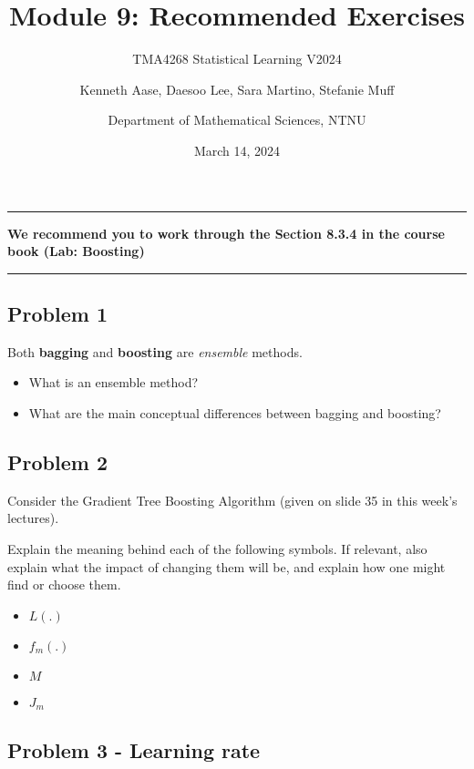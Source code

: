 \documentclass[
]{article}
\title{Module 9: Recommended Exercises}
\subtitle{TMA4268 Statistical Learning V2024}
\author{Kenneth Aase, Daesoo Lee, Sara Martino, Stefanie
Muff \and Department of Mathematical Sciences, NTNU}
\date{March 14, 2024}
\providecommand{\tightlist}{%
  \setlength{\itemsep}{0pt}\setlength{\parskip}{0pt}}
\begin{document}
\maketitle

\begin{center}\rule{0.5\linewidth}{0.5pt}\end{center}

\textbf{We recommend you to work through the Section 8.3.4 in the course
book (Lab: Boosting)}

\begin{center}\rule{0.5\linewidth}{0.5pt}\end{center}

\hypertarget{problem-1}{%
\subsection{Problem 1}\label{problem-1}}

Both \textbf{bagging} and \textbf{boosting} are \emph{ensemble} methods.

\begin{itemize}
\tightlist
\item
  What is an ensemble method?
\item
  What are the main conceptual differences between bagging and boosting?
\end{itemize}

\hypertarget{problem-2}{%
\subsection{Problem 2}\label{problem-2}}

Consider the Gradient Tree Boosting Algorithm (given on slide 35 in this
week's lectures).

Explain the meaning behind each of the following symbols. If relevant,
also explain what the impact of changing them will be, and explain how
one might find or choose them.

\begin{itemize}
\tightlist
\item
  \(L(.)\)
\item
  \(f_m(.)\)
\item
  \(M\)
\item
  \(J_m\)
\end{itemize}

\hypertarget{problem-3---learning-rate}{%
\subsection{Problem 3 - Learning rate}\label{problem-3---learning-rate}}
\end{document}
